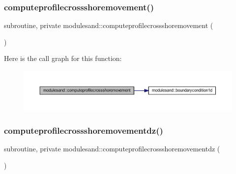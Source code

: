 \subsubsection{\texorpdfstring{computeprofilecrossshoremovement()}{computeprofilecrossshoremovement()}}
{\footnotesize\ttfamily subroutine, private modulesand\+::computeprofilecrossshoremovement (\begin{DoxyParamCaption}{ }\end{DoxyParamCaption})\hspace{0.3cm}{\ttfamily [private]}}

Here is the call graph for this function\+:\nopagebreak
\begin{figure}[H]
\begin{center}
\leavevmode
\includegraphics[width=350pt]{namespacemodulesand_abe98db28fdf5e787bd658f6e3b181923_cgraph}
\end{center}
\end{figure}
\mbox{\label{namespacemodulesand_a5316ef806da7d9e5bca8d121c7f5fa28}} 
\subsubsection{\texorpdfstring{computeprofilecrossshoremovementdz()}{computeprofilecrossshoremovementdz()}}
{\footnotesize\ttfamily subroutine, private modulesand\+::computeprofilecrossshoremovementdz (\begin{DoxyParamCaption}{ }\end{DoxyParamCaption})\hspace{0.3cm}{\ttfamily [private]}}

